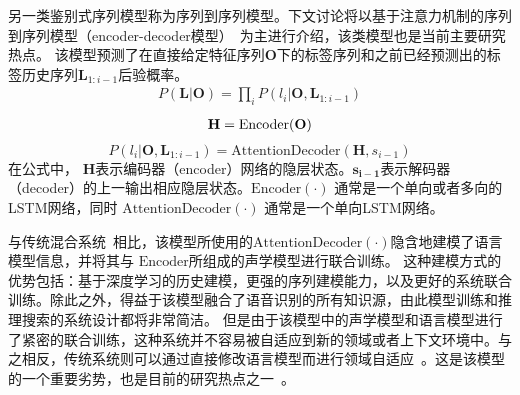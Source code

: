 另一类鉴别式序列模型称为序列到序列模型。下文讨论将以基于注意力机制的序列到序列模型（encoder-decoder模型）~\cite{chan2016end}为主进行介绍，该类模型也是当前主要研究热点。
该模型预测了在直接给定特征序列$\mathbf{O}$下的标签序列和之前已经预测出的标签历史序列$\mathbf{L}_{1:i-1}$后验概率。
\begin{equation}
\label{equ:enc-dec}
\begin{split}
P(\mathbf{L}|\mathbf{O})=\prod_i P(l_{i}|\mathbf{O},\mathbf{L}_{1:i-1})
\end{split}
\end{equation}
\begin{equation}
\label{equ:enc-dec-hid}
\begin{split}
\mathbf{H}&=\text{Encoder}(\mathbf{O})\\
\end{split}
\vspace{-0.3em}  
\end{equation}
\begin{equation}
\label{equ:enc-dec-dec}
P(l_{i}|\mathbf{O},\mathbf{L}_{1:i-1})=\text{AttentionDecoder}(\mathbf{H}, s_{i-1})
\end{equation}
在公式中， $\mathbf{H}$表示编码器（encoder）网络的隐层状态。$\mathbf{s_{i-1}}$表示解码器（decoder）的上一输出相应隐层状态。$\text{Encoder}(\cdot)$ 通常是一个单向或者多向的LSTM网络，同时 $\text{AttentionDecoder}(\cdot)$ 通常是一个单向LSTM网络。 %

与传统混合系统~\cite{hinton2012deep}相比，该模型所使用的$\text{AttentionDecoder}(\cdot)$隐含地建模了语言模型信息，并将其与 $\text{Encoder}$所组成的声学模型进行联合训练。
%
%
这种建模方式的优势包括：基于深度学习的历史建模，更强的序列建模能力，以及更好的系统联合训练。除此之外，得益于该模型融合了语音识别的所有知识源，由此模型训练和推理搜索的系统设计都将非常简洁。
但是由于该模型中的声学模型和语言模型进行了紧密的联合训练，这种系统并不容易被自适应到新的领域或者上下文环境中。与之相反，传统系统则可以通过直接修改语言模型而进行领域自适应~\cite{mcgraw2016personalized}。这是该模型的一个重要劣势，也是目前的研究热点之一~\cite{zhc00-chen-icassp19}。 


